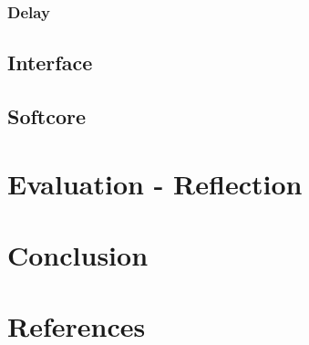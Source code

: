 \documentclass[12p]{article}
\begin{document}
\subsubsection{Delay}

\subsection{Interface}
\label{Design:Interface}

\subsection{Softcore}
\label{Design:Softcore}





\newpage
\section{Evaluation - Reflection}
\label{Evaluation-Reflection}




\section{Conclusion}
\label{Conclusion}







\newpage
\section*{References}






\end{document}
